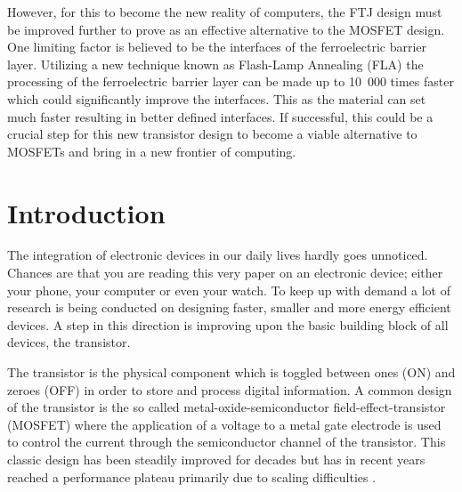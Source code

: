 \documentclass[11pt,twoside]{eitExjobb}
\begin{document}
However, for this to become the new reality of computers, the FTJ design must be
improved further to prove as an effective alternative to the MOSFET design. One
limiting factor is believed to be the interfaces of the ferroelectric barrier
layer. Utilizing a new technique known as Flash-Lamp Annealing (FLA) the
processing of the ferroelectric barrier layer can be made up to 10 000 times
faster which could significantly improve the interfaces. This as the material
can set much faster resulting in better defined interfaces. If successful, this
could be a crucial step for this new transistor design to become a viable
alternative to MOSFETs and bring in a new frontier of computing.

\tableofcontents
\listoffigures
\listoftables
\cleardoublepage{}
\mainmatter{}
\chapter{Introduction}\label{ch:intro}

The integration of electronic devices in our daily lives hardly goes unnoticed.
Chances are that you are reading this very paper on an electronic device;
either your phone, your computer or even your watch. To keep up with demand a
lot of research is being conducted on designing faster, smaller and more energy
efficient devices. A step in this direction is improving upon the basic
building block of all devices, the transistor.

The transistor is the physical component which is toggled between ones (ON) and
zeroes (OFF) in order to store and process digital information. A common design
of the transistor is the so called metal-oxide-semiconductor
field-effect-transistor (MOSFET) where the application of a voltage to a metal gate
electrode is used to control the current through the semiconductor channel of the
transistor. This classic design has been steadily improved for decades but has
in recent years reached a performance plateau primarily due to scaling
difficulties \cite{ratnech2021advancement}.

\cite{garcia2014ferroelectric}

\cite{mikolajick2020past, boscke2011ferroelectricity}

\cite{cheema2020one, grenouillet2020nanosecond}
\end{document}
